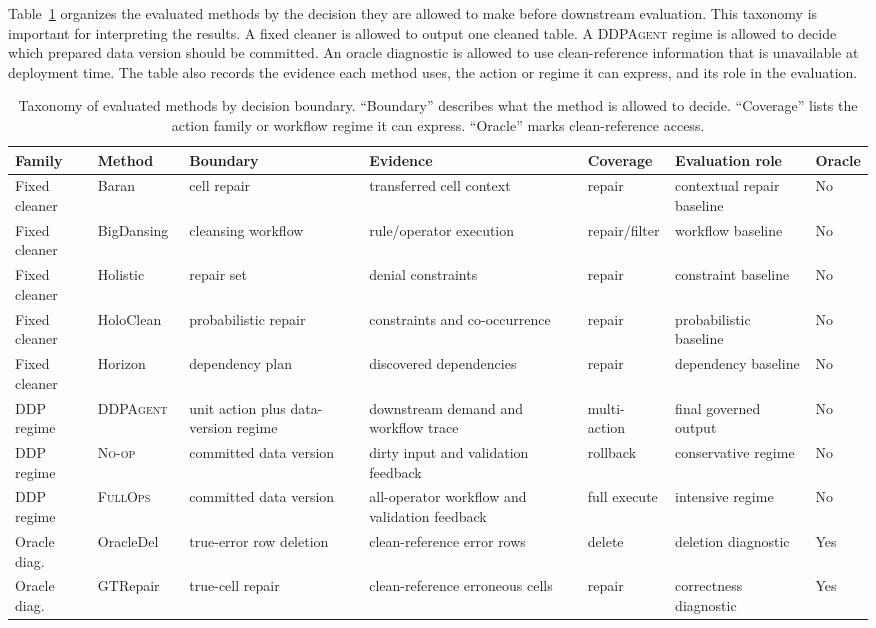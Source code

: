 \documentclass[sigconf, nonacm]{acmart}
\newcommand{\sys}{\textsc{DDPAgent}\xspace}
\newcommand{\noop}{\textsc{No-op}\xspace}
\newcommand{\fullops}{\textsc{FullOps}\xspace}
\begin{document}
Table~\ref{tab:baseline-taxonomy} organizes the evaluated methods by the decision they are allowed to make before downstream evaluation. This taxonomy is important for interpreting the results. A fixed cleaner is allowed to output one cleaned table. A \sys regime is allowed to decide which prepared data version should be committed. An oracle diagnostic is allowed to use clean-reference information that is unavailable at deployment time. The table also records the evidence each method uses, the action or regime it can express, and its role in the evaluation.

\begin{table}[t]
  \caption{Taxonomy of evaluated methods by decision boundary. ``Boundary'' describes what the method is allowed to decide. ``Coverage'' lists the action family or workflow regime it can express. ``Oracle'' marks clean-reference access.}
  \label{tab:baseline-taxonomy}
  \centering
  \small
  \begin{tabular}{@{}p{}p{}p{}p{}p{}p{}p{}@{}}
    \toprule
    Family & Method & Boundary & Evidence & Coverage & Evaluation role & Oracle \\
    \midrule
    Fixed cleaner & Baran~\cite{mahdavi2019baran} & cell repair & transferred cell context & repair & contextual repair baseline & No \\
    Fixed cleaner & BigDansing~\cite{khayyat2015bigdansing} & cleansing workflow & rule/operator execution & repair/filter & workflow baseline & No \\
    Fixed cleaner & Holistic~\cite{chu2013holistic} & repair set & denial constraints & repair & constraint baseline & No \\
    Fixed cleaner & HoloClean~\cite{rekatsinas2017holoclean} & probabilistic repair & constraints and co-occurrence & repair & probabilistic baseline & No \\
    Fixed cleaner & Horizon~\cite{horizon} & dependency plan & discovered dependencies & repair & dependency baseline & No \\
    DDP regime & \sys & unit action plus data-version regime & downstream demand and workflow trace & multi-action & final governed output & No \\
    DDP regime & \noop & committed data version & dirty input and validation feedback & rollback & conservative regime & No \\
    DDP regime & \fullops & committed data version & all-operator workflow and validation feedback & full execute & intensive regime & No \\
    Oracle diag. & OracleDel & true-error row deletion & clean-reference error rows & delete & deletion diagnostic & Yes \\
    Oracle diag. & GTRepair & true-cell repair & clean-reference erroneous cells & repair & correctness diagnostic & Yes \\
    \bottomrule
  \end{tabular}
\end{table}
\end{document}
